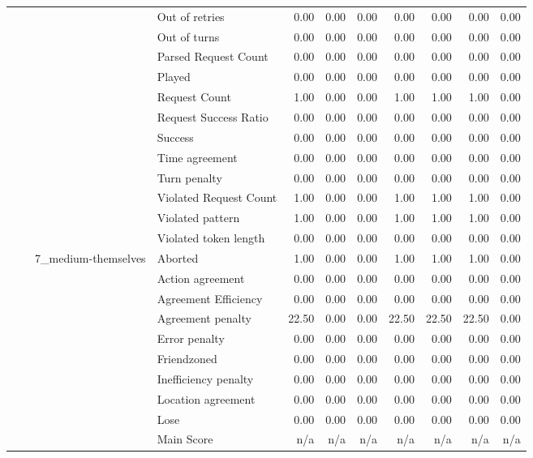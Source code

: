 \begin{tabular}{llllrrrrrrr}
 &  &  & Out of retries & 0.00 & 0.00 & 0.00 & 0.00 & 0.00 & 0.00 & 0.00 \\
 &  &  & Out of turns & 0.00 & 0.00 & 0.00 & 0.00 & 0.00 & 0.00 & 0.00 \\
 &  &  & Parsed Request Count & 0.00 & 0.00 & 0.00 & 0.00 & 0.00 & 0.00 & 0.00 \\
 &  &  & Played & 0.00 & 0.00 & 0.00 & 0.00 & 0.00 & 0.00 & 0.00 \\
 &  &  & Request Count & 1.00 & 0.00 & 0.00 & 1.00 & 1.00 & 1.00 & 0.00 \\
 &  &  & Request Success Ratio & 0.00 & 0.00 & 0.00 & 0.00 & 0.00 & 0.00 & 0.00 \\
 &  &  & Success & 0.00 & 0.00 & 0.00 & 0.00 & 0.00 & 0.00 & 0.00 \\
 &  &  & Time agreement & 0.00 & 0.00 & 0.00 & 0.00 & 0.00 & 0.00 & 0.00 \\
 &  &  & Turn penalty & 0.00 & 0.00 & 0.00 & 0.00 & 0.00 & 0.00 & 0.00 \\
 &  &  & Violated Request Count & 1.00 & 0.00 & 0.00 & 1.00 & 1.00 & 1.00 & 0.00 \\
 &  &  & Violated pattern & 1.00 & 0.00 & 0.00 & 1.00 & 1.00 & 1.00 & 0.00 \\
 &  &  & Violated token length & 0.00 & 0.00 & 0.00 & 0.00 & 0.00 & 0.00 & 0.00 \\
\cline{3-11}
 &  & \multirow[t]{27}{*}{7_medium-themselves} & Aborted & 1.00 & 0.00 & 0.00 & 1.00 & 1.00 & 1.00 & 0.00 \\
 &  &  & Action agreement & 0.00 & 0.00 & 0.00 & 0.00 & 0.00 & 0.00 & 0.00 \\
 &  &  & Agreement Efficiency & 0.00 & 0.00 & 0.00 & 0.00 & 0.00 & 0.00 & 0.00 \\
 &  &  & Agreement penalty & 22.50 & 0.00 & 0.00 & 22.50 & 22.50 & 22.50 & 0.00 \\
 &  &  & Error penalty & 0.00 & 0.00 & 0.00 & 0.00 & 0.00 & 0.00 & 0.00 \\
 &  &  & Friendzoned & 0.00 & 0.00 & 0.00 & 0.00 & 0.00 & 0.00 & 0.00 \\
 &  &  & Inefficiency penalty & 0.00 & 0.00 & 0.00 & 0.00 & 0.00 & 0.00 & 0.00 \\
 &  &  & Location agreement & 0.00 & 0.00 & 0.00 & 0.00 & 0.00 & 0.00 & 0.00 \\
 &  &  & Lose & 0.00 & 0.00 & 0.00 & 0.00 & 0.00 & 0.00 & 0.00 \\
 &  &  & Main Score & n/a & n/a & n/a & n/a & n/a & n/a & n/a \\

\end{tabular}
